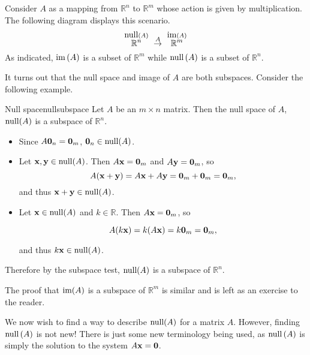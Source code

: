 Consider
$A$ as a mapping from $\mathbb{R}^{n}$ to $\mathbb{R}^{m}$ whose action is given by multiplication. The following diagram displays this scenario. 
\begin{equation*}
\overset{\func{null} \left( A\right) }{\mathbb{R}^{n}}\ \overset{A}{\rightarrow }\ 
\overset{
\func{im}\left( A\right) }{\mathbb{R}^{m}}
\end{equation*}
As indicated, $\mbox{im}\left( A\right) $ is a subset of $\mathbb{R}^{m}$
while $\mbox{null} \left( A\right) $ is a subset of $\mathbb{R}^{n}$.

It turns out that the null space and image of $A$ are both subspaces. Consider the following example.

\begin{example}{Null space}{nullsubspace}
Let $A$ be an $m\times n$ matrix. Then the null space of $A$, $\mbox{null}(A)$ is 
a subspace of $\mathbb{R}^n$.
\end{example}

\begin{solution}
\begin{itemize}
\item Since $A{\bf 0}_n={\bf 0}_m$, 
${\bf 0}_n\in\mbox{null}(A)$.

\item Let ${\bf x},{\bf y}\in\mbox{null}(A)$. 
Then $A{\bf x}={\bf 0}_m$ and $A{\bf y}={\bf 0}_m$, so
\[ A({\bf x}+{\bf y})=A{\bf x}+A{\bf y} = {\bf 0}_m+{\bf 0}_m={\bf 0}_m,\]
and thus ${\bf x}+{\bf y}\in\mbox{null}(A)$.
\item Let ${\bf x}\in\mbox{null}(A)$ and $k\in\mathbb{R}$.
Then $A{\bf x}={\bf 0}_m$, so

\[ A(k{\bf x}) = k(A{\bf x})=k{\bf 0}_m={\bf 0}_m,\]

and thus $k{\bf x}\in\mbox{null}(A)$.
\end{itemize}
Therefore by the subspace test, $\mbox{null}(A)$ is a subspace of $\mathbb{R}^n$.

\end{solution}

The proof that $\mbox{im}(A)$ is a subspace of $\mathbb{R}^m$ is similar and is left as an exercise to the reader. 

We now wish to find a way to describe $\mbox{null}(A)$ for a matrix $A$. However, finding $\mbox{null} \left( A\right)$ is not new! There is just some new
terminology being used, as $\mbox{null} \left( A\right) $ is simply the solution
to the system $A{\bf x}={\bf 0}$.

